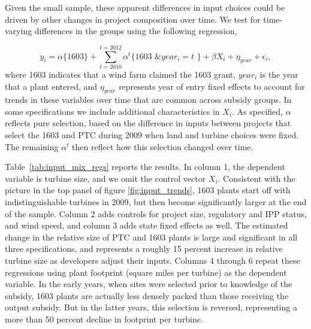 \documentclass[12pt]{article}
\begin{document}
Given the small sample, these apparent differences in input choices could be driven by other changes in project composition over time. We test for time-varying differences in the groups using the following regression, 

\begin{equation}
y_{i}= \alpha\text{\{1603\}} + \sum_{t=2010}^{t=2012} \alpha^t\text{\{1603 \& $year_i =t$ \}} + \beta X_i + \eta_{year} + \epsilon_{i},\label{eq:capitalbias}
\end{equation}
where 1603 indicates that a wind farm claimed the 1603 grant, $year_i$ is the year that a plant entered, and $\eta_{year}$ represents year of entry fixed effects to account for trends in these variables over time that are common across subsidy groups. In some specifications we include additional characteristics in $X_i$. As specified, $\alpha$ reflects pure selection, based on the difference in inputs between projects that select the 1603 and PTC during 2009 when land and turbine choices were fixed. The remaining $\alpha^t$ then reflect how this selection changed over time. 

Table~\ref{tab:input_mix_regs} reports the results. In column 1, the dependent variable is turbine size, and we omit the control vector $X_i$. Consistent with the picture in the top panel of figure \ref{fig:input_trends}, 1603 plants start off with indistinguishable turbines in 2009, but then become significantly larger at the end of the sample. Column 2 adds controls for project size, regulatory and IPP status, and wind speed, and column 3 adds state fixed effects as well. The estimated change in the relative size of PTC and 1603 plants is large and significant in all three specifications, and represents a roughly 15 percent increase in relative turbine size as developers adjust their inputs. Columns 4 through 6 repeat these regressions using plant footprint (square miles per turbine) as the dependent variable. In the early years, when sites were selected prior to knowledge of the subsidy, 1603 plants are actually less densely packed than those receiving the output subsidy. But in the latter years, this selection is reversed, representing a more than 50 percent decline in footprint per turbine. 
\end{document}
